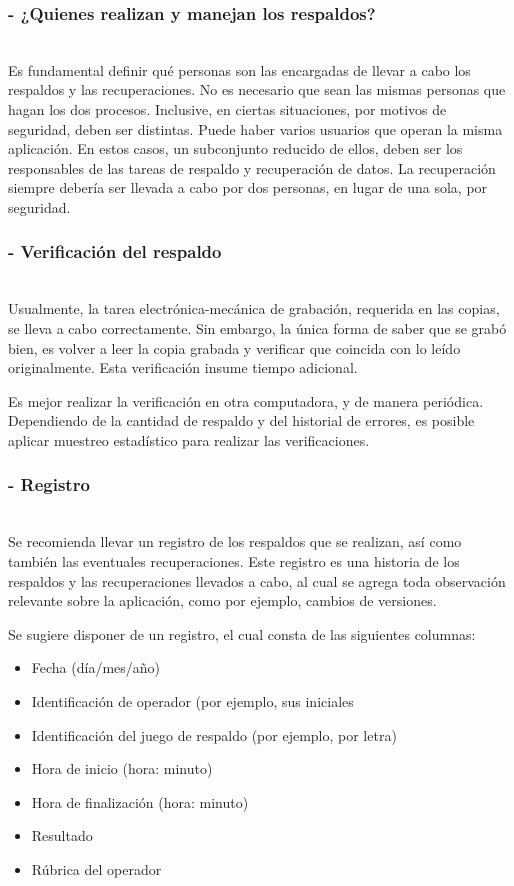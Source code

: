 \subsubsection{- ¿Quienes realizan y manejan los  respaldos? } 
\\
Es fundamental definir qué personas son las encargadas de llevar a cabo los respaldos y las recuperaciones. No es necesario que sean las mismas personas que hagan los dos procesos. Inclusive, en ciertas situaciones, por motivos de seguridad, deben ser distintas. Puede haber varios usuarios que operan la misma aplicación. En estos casos, un subconjunto reducido de ellos, deben ser los responsables de las tareas de respaldo y recuperación de datos. La recuperación siempre debería ser llevada a cabo por dos personas, en lugar de una sola, por seguridad.

\subsubsection{- Verificación del respaldo } 
\\
Usualmente, la tarea electrónica-mecánica de grabación, requerida en las copias, se lleva a cabo correctamente. Sin embargo, la única forma de saber que se grabó bien, es volver a leer la copia grabada y verificar que coincida con lo leído originalmente. Esta verificación insume tiempo adicional. 
 
Es mejor realizar la verificación en otra computadora, y de manera periódica. Dependiendo de la cantidad de respaldo y del historial de errores, es posible aplicar muestreo estadístico para realizar las verificaciones. 

\subsubsection{- Registro }
\\
Se recomienda llevar un registro de los respaldos que se realizan, así como también las eventuales recuperaciones. Este registro es una historia de los respaldos y las recuperaciones llevados a cabo, al cual se agrega toda observación relevante sobre la aplicación, como por ejemplo, cambios de versiones. 
 
Se sugiere disponer de un registro, el cual consta de las siguientes columnas: 
\begin{itemize}
\item{Fecha (día/mes/año)}
\item{Identificación de operador (por ejemplo, sus iniciales}
\item{Identificación del juego de respaldo (por ejemplo, por letra) }
\item{Hora de inicio (hora: minuto)}
\item{Hora de finalización (hora: minuto)}
\item{Resultado}
\item{Rúbrica del operador }
\end{itemize}


